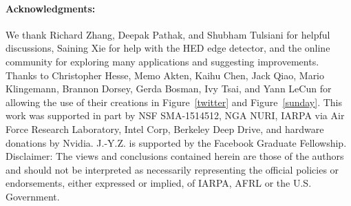 \documentclass[10pt,twocolumn,letterpaper]{article}
\begin{document}
\paragraph{Acknowledgments:} We thank Richard Zhang, Deepak Pathak, and Shubham Tulsiani for helpful discussions, Saining Xie for help with the HED edge detector, and the online community for exploring many applications and suggesting improvements. Thanks to Christopher Hesse, Memo Akten, Kaihu Chen, Jack Qiao, Mario Klingemann, Brannon Dorsey, Gerda Bosman, Ivy Tsai, and Yann LeCun for allowing the use of their creations in Figure~\ref{twitter} and Figure~\ref{sunday}. This work was supported in part by NSF SMA-1514512, NGA NURI, IARPA via Air Force Research Laboratory, Intel Corp, Berkeley Deep Drive, and hardware donations by Nvidia. J.-Y.Z. is supported by the Facebook Graduate Fellowship. Disclaimer: The views and conclusions contained herein are those of the authors and should not be interpreted as necessarily representing the official policies or endorsements, either expressed or implied, of IARPA, AFRL or the U.S. Government.
\end{document}
